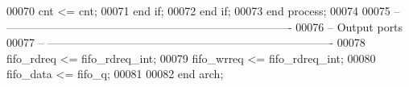 \begin{DoxyCode}
00070             \textcolor{vhdlchar}{cnt} \textcolor{vhdlchar}{<=} \textcolor{vhdlchar}{cnt};
00071          \textcolor{keywordflow}{end} \textcolor{keywordflow}{if};
00072       \textcolor{keywordflow}{end} \textcolor{keywordflow}{if};
00073    \textcolor{keywordflow}{end} \textcolor{keywordflow}{process};
00074     
00075 \textcolor{keyword}{-- ----------------------------------------------------------------------------}
00076 \textcolor{keyword}{-- Output ports}
00077 \textcolor{keyword}{-- ----------------------------------------------------------------------------    }
00078    \textcolor{vhdlchar}{fifo_rdreq} \textcolor{vhdlchar}{<=} \textcolor{vhdlchar}{fifo_rdreq_int};   
00079    \textcolor{vhdlchar}{fifo_wrreq} \textcolor{vhdlchar}{<=} \textcolor{vhdlchar}{fifo_rdreq_int};
00080    \textcolor{vhdlchar}{fifo_data}  \textcolor{vhdlchar}{<=} \textcolor{vhdlchar}{fifo_q};
00081   
00082 \textcolor{keywordflow}{end} \textcolor{vhdlchar}{arch};   
\end{DoxyCode}
